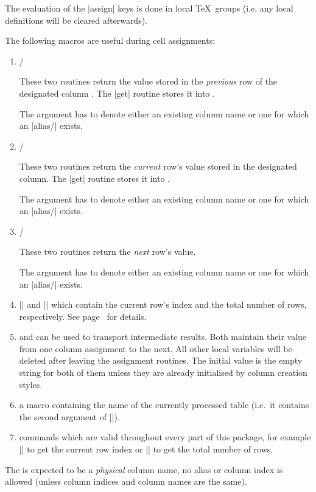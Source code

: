 \begin{command}{\pgfplotstablecreatecol{}}
The evaluation of the |assign| keys is done in local \TeX\ groups (i.e. any local definitions will be cleared afterwards).

The following macros are useful during cell assignments:
\begin{enumerate}
	\item \declareandlabel{\prevrow} / \declareandlabel{\getprevrow}

	These two routines return the value stored in the \emph{previous} row of the designated column . The |get| routine stores it into .

	The argument  has to denote either an existing column name or one for which an |alias/| exists.

	\item \declareandlabel{\thisrow} / \declareandlabel{\getthisrow}

	These two routines return the \emph{current} row's value stored in the designated column. The |get| routine stores it into .

	The argument  has to denote either an existing column name or one for which an |alias/| exists.

	\item \declareandlabel{\nextrow} / \declareandlabel{\getnextrow}

	These two routines return the \emph{next} row's value.

	The argument  has to denote either an existing column name or one for which an |alias/| exists.

	\item |\pgfplotstablerow| and |\pgfplotstablerows| which contain the current row's index and the total number of rows, respectively. See page~\pageref{pgfplotstable:page:tablerow} for details.
	\item \declareandlabel{\pgfmathaccuma} and \declareandlabel{\pgfmathaccumb} can be used to transport intermediate results.
	Both maintain their value from one column assignment to the next. All other local variables will be deleted after leaving the assignment routines. The initial value is the empty string for both of them unless they are already initialised by column creation styles.
	\item \declareandlabel{\pgfplotstablename} a macro containing the name of the currently processed table (i.e.\ it contains the second argument of |\pgfplotstablecreatecol|).
	\item commands which are valid throughout every part of this package, for example |\pgfplotstablerow| to get the current row index or |\pgfplotstablerows| to get the total number of rows.
\end{enumerate}
The  is expected to be a \emph{physical} column name, no alias or column index is allowed (unless column indices and column names are the same).


\end{command}
